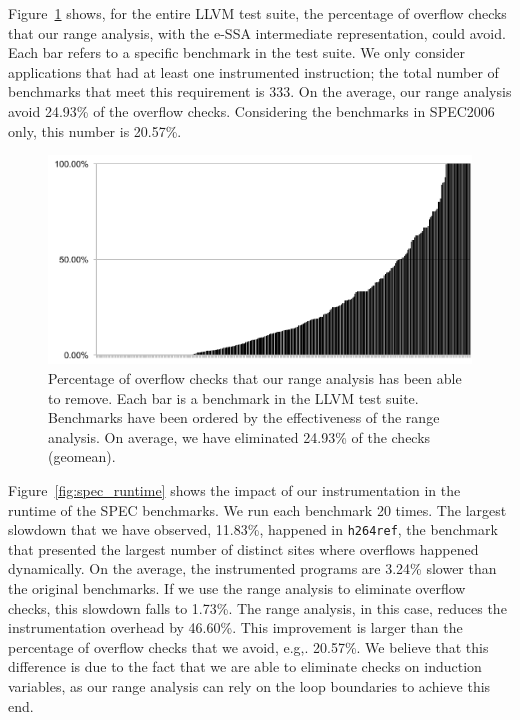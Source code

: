 \documentclass[preprint]{sigplanconf}[10pt]
\begin{document}
Figure~\ref{fig:percentage_elimination} shows, for the entire LLVM test
suite, the percentage of overflow checks that our range analysis, with the
e-SSA intermediate representation, could avoid.
Each bar refers to a specific benchmark in the test suite.
We only consider applications that had at least one instrumented
instruction; the total number of benchmarks that meet this requirement is
333.
On the average, our range analysis avoid 24.93\% of the overflow checks.
Considering the benchmarks in SPEC2006 only, this number is 20.57\%.

\begin{figure}[t!]
\begin{center}
\includegraphics[width=\columnwidth]{images/percentage_elimination}
\end{center}
\caption{\label{fig:percentage_elimination}
Percentage of overflow checks that our range analysis has been able to remove.
Each bar is a benchmark in the LLVM test suite.
Benchmarks have been ordered by the effectiveness of the range analysis.
On average, we have eliminated 24.93\% of the checks (geomean).}
\end{figure}

Figure~\ref{fig:spec_runtime} shows the impact of our instrumentation in the
runtime of the SPEC benchmarks.
We run each benchmark 20 times.
The largest slowdown that we have observed, 11.83\%, happened in
\texttt{h264ref}, the benchmark that presented the largest number of distinct
sites where overflows happened dynamically. 
On the average, the instrumented programs are 3.24\% slower than the
original benchmarks.
If we use the range analysis to eliminate overflow checks, this slowdown falls
to 1.73\%.
The range analysis, in this case, reduces the instrumentation overhead by
46.60\%.
This improvement is larger than the percentage of overflow checks that we
avoid, e.g,. 20.57\%.
We believe that this difference is due to the fact that we are able to
eliminate checks on induction variables, as our range analysis can rely on
the loop boundaries to achieve this end.
\end{document}
